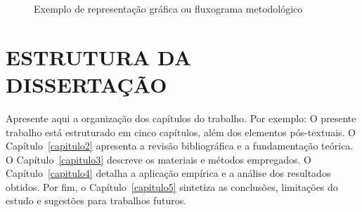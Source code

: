 \begin{figure}[htbp]
  \centering
  \caption{Exemplo de representação gráfica ou fluxograma metodológico}
  \label{fig:exemplo_figura}
\end{figure}

\section{ESTRUTURA DA DISSERTAÇÃO}
\label{sec:estrutura}

Apresente aqui a organização dos capítulos do trabalho. Por exemplo:
O presente trabalho está estruturado em cinco capítulos, além dos elementos pós-textuais. O Capítulo~\ref{capitulo2} apresenta a revisão bibliográfica e a fundamentação teórica. O Capítulo~\ref{capitulo3} descreve os materiais e métodos empregados. O Capítulo~\ref{capitulo4} detalha a aplicação empírica e a análise dos resultados obtidos. Por fim, o Capítulo~\ref{capitulo5} sintetiza as conclusões, limitações do estudo e sugestões para trabalhos futuros.
